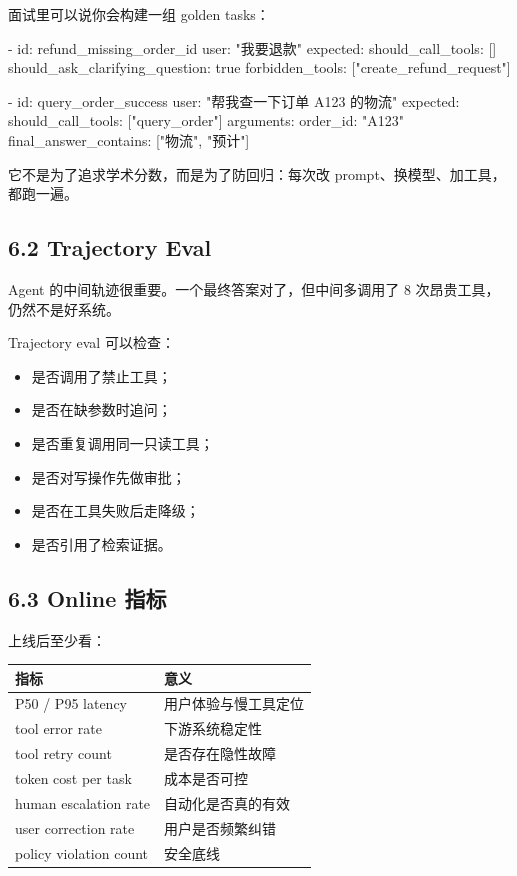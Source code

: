 面试里可以说你会构建一组 golden tasks：


\begin{codeblock}
- id: refund_missing_order_id
  user: "我要退款"
  expected:
    should_call_tools: []
    should_ask_clarifying_question: true
    forbidden_tools: ["create_refund_request"]

- id: query_order_success
  user: "帮我查一下订单 A123 的物流"
  expected:
    should_call_tools: ["query_order"]
    arguments:
      order_id: "A123"
    final_answer_contains: ["物流", "预计"]
\end{codeblock}

它不是为了追求学术分数，而是为了防回归：每次改 prompt、换模型、加工具，都跑一遍。


\subsection{6.2 Trajectory Eval}

Agent 的中间轨迹很重要。一个最终答案对了，但中间多调用了 8 次昂贵工具，仍然不是好系统。


Trajectory eval 可以检查：


\begin{itemize}[leftmargin=2em]
\item 是否调用了禁止工具；
\item 是否在缺参数时追问；
\item 是否重复调用同一只读工具；
\item 是否对写操作先做审批；
\item 是否在工具失败后走降级；
\item 是否引用了检索证据。
\end{itemize}

\subsection{6.3 Online 指标}

上线后至少看：


\begingroup
\scriptsize
\setlength{\tabcolsep}{3pt}
\begin{longtable}{|p{}|p{}|}
\hline
指标 & 意义 \\ \hline
P50 / P95 latency & 用户体验与慢工具定位 \\ \hline
tool error rate & 下游系统稳定性 \\ \hline
tool retry count & 是否存在隐性故障 \\ \hline
token cost per task & 成本是否可控 \\ \hline
human escalation rate & 自动化是否真的有效 \\ \hline
user correction rate & 用户是否频繁纠错 \\ \hline
policy violation count & 安全底线 \\ \hline
\end{longtable}
\endgroup

